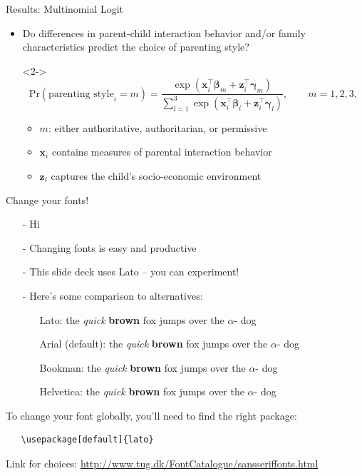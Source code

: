 \documentclass[notes, 12.5pt, aspectratio=169]{beamer}
\newcommand{\be}{\bm{\beta}}
\newcommand{\x}{\textbf{x}}
\newcommand{\z}{\textbf{z}}
\begin{document}
\begin{frame}{Results: Multinomial Logit}
	\begin{itemize}[(I)]
		\item<1-> Do differences in parent-child interaction behavior and/or family characteristics predict the choice of parenting style?
		\item[]<2-> \begin{equation*} \text{Pr}(\text{parenting style}_i = m) = \frac{\exp(\x^\top_{i} \be_m + \z^\top_{i} \bm{\gamma}_m)}{\sum_{l=1}^{3} \exp(\x^\top_{i}\be_l + \z^\top_{i} \bm{\gamma}_l)}, \qquad m = 1, 2, 3, \label{eq:multinom}
		\end{equation*}
		\begin{itemize}
			\item <2-> $m$: either authoritative, authoritarian, or permissive
			\item <2-> $\x_i$ contains measures of parental interaction behavior
			\item <2-> $\z_i$ captures the child's socio-economic environment
		\end{itemize} 
	\end{itemize}
\end{frame}

\begin{frame}[fragile]{Change your fonts!}
  \begin{itemize}
  \item[-] Hi
  \item[-] Changing fonts is easy and productive
  \item[-] This slide deck uses Lato -- you can experiment!
  \item[-] Here's some comparison to alternatives:\\
    \begin{itemize}
    \item[]    {Lato: the \textit{quick} \textbf{brown} fox jumps over the $\alpha$- dog}\\
    \item[]     {\selectfont  Arial (default): the \textit{quick} \textbf{brown} fox jumps over the $\alpha$- dog}\\
    \item[]     {\selectfont  Bookman: the \textit{quick} \textbf{brown} fox jumps over the $\alpha$- dog}\\
    \item[]     {\selectfont  Helvetica: the \textit{quick} \textbf{brown} fox jumps over the $\alpha$- dog}\\
    \end{itemize}
  \end{itemize}
  \bigskip
  To change your font globally, you'll need to find the right package:
  \begin{verbatim}
   \usepackage[default]{lato}
   \end{verbatim}
  Link for choices: \url{http://www.tug.dk/FontCatalogue/sansseriffonts.html}
\end{frame}
\end{document}
